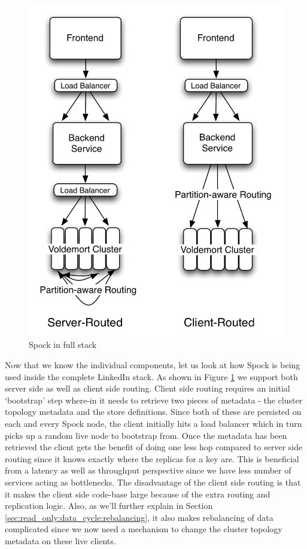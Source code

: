\documentclass[twocolumn]{article}
\newcommand{\projectname}{Spock}
\begin{document}
\begin{figure}
  \centering
    \includegraphics[scale=0.60]{images/fullstack.png}
  \caption{\projectname{} in full stack}
  \label{fullstack}
\end{figure}


\noindent 
Now that we know the individual components, let us look at how \projectname{} is being used inside the complete LinkedIn stack. As shown in Figure \ref{fullstack} we support both server side as well as client side routing. Client side routing requires an initial `bootstrap' step where-in it needs to retrieve two pieces of metadata - the cluster topology metadata and the store definitions. Since both of these are persisted on each and every \projectname{} node, the client initially hits a load balancer which in turn picks up a random live node to bootstrap from. Once the metadata has been retrieved the client gets the benefit of doing one less hop compared to server side routing since it knows exactly where the replicas for a key are. This is beneficial from a latency as well as throughput perspective since we have less number of services acting as bottlenecks. The disadvantage of the client side routing is that it makes the client side code-base large because of the extra routing and replication logic. Also, as we'll further explain in Section \ref{sec:read_only:data_cycle:rebalancing}, it also makes rebalancing of data complicated since we now need a mechanism to change the cluster topology metadata on these live clients. 
\end{document}
